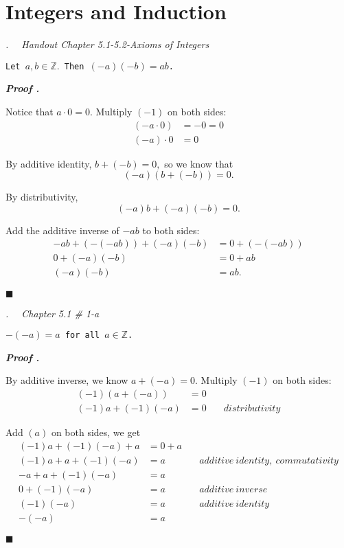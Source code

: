 \documentclass[11pt,letter]{article}
\newcounter{nq}[section]
\newcounter{np}[section]
\newenvironment*{p}{\par\noindent\textbf{\textit{Proof \stepcounter{np}\thenp. }}\par}{\par\hfill $\blacksquare$\par}
\newenvironment*{q}[1]{\noindent\emph{\thesection.\stepcounter{nq}\thenq$\quad $ #1}\par\noindent\texttt}{}
\def\Z{{\mathbb{Z}}}
\begin{document}
\newpage
\section{Integers and Induction}
\begin{framed}\begin{q}
	{Handout Chapter 5.1-5.2-Axioms of Integers}
	{Let $a,b\in\Z.$ Then $(-a)(-b)=ab$.}
\end{q}\end{framed}
\begin{p}
	Notice that $a\cdot0=0$. Multiply $(-1)$ on both sides: \[\begin{aligned}(-a\cdot0)&=-0=0\\(-a)\cdot0&=0\end{aligned}\]\par By additive identity, $b+(-b)=0,$ so we know that \[(-a)(b+(-b))=0.\]\par By distributivity, \[(-a)b+(-a)(-b)=0.\]\par Add the additive inverse of $-ab$ to both sides: \[\begin{aligned}-ab+(-(-ab))+(-a)(-b)&=0+(-(-ab))\\0+(-a)(-b)&=0+ab\\(-a)(-b)&=ab.\end{aligned}\]
\end{p}

\begin{framed}\begin{q}
	{Chapter 5.1 \# 1-a}
	{$-(-a)=a$ for all $a\in\Z$.}
\end{q}\end{framed}
\begin{p}
	By additive inverse, we know $a+(-a)=0.$ Multiply $(-1)$ on both sides: \[\begin{aligned}(-1)(a+(-a))&=0&\\(-1)a+(-1)(-a)&=0&\quad distributivity\end{aligned}\]\par Add $(a)$ on both sides, we get \[\begin{aligned}(-1)a+(-1)(-a)+a&=0+a&\\(-1)a+a+(-1)(-a)&=a&\quad additive\ identity,\ commutativity\\-a+a+(-1)(-a)&=a&\\0+(-1)(-a)&=a&\quad additive\ inverse\\(-1)(-a)&=a&\quad additive\ identity\\-(-a)&=a&\end{aligned}\]
\end{p}
\end{document}
